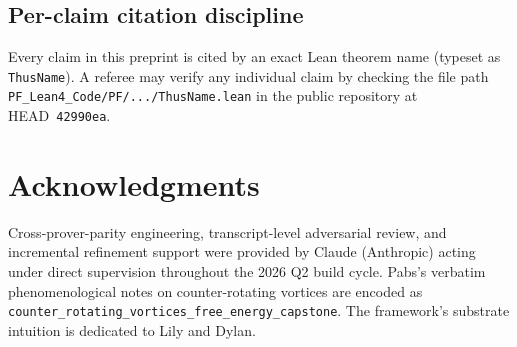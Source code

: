 \documentclass[11pt,a4paper]{article}
\theoremstyle{definition}
\theoremstyle{remark}
\newcommand{\lean}[1]{\texttt{\small #1}}
\begin{document}
\subsection{Per-claim citation discipline}

Every claim in this preprint is cited by an exact Lean theorem
name (typeset as \lean{ThusName}). A referee may verify any
individual claim by checking the file path
\lean{PF\_Lean4\_Code/PF/.../ThusName.lean} in the public
repository at HEAD~\texttt{42990ea}.

\section*{Acknowledgments}

Cross-prover-parity engineering, transcript-level adversarial
review, and incremental refinement support were provided by
Claude (Anthropic) acting under direct supervision throughout
the 2026 Q2 build cycle. Pabs's verbatim phenomenological notes
on counter-rotating vortices are encoded as
\lean{counter\_rotating\_vortices\_free\_energy\_capstone}. The
framework's substrate intuition is dedicated to Lily and Dylan.
\end{document}
